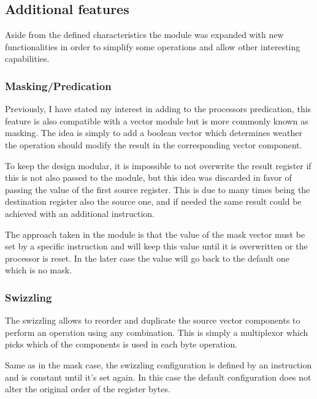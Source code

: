 \subsection{Additional features}
Aside from the defined characteristics the module was expanded with
new functionalities in order to simplify some operations and allow 
other interesting capabilities.

\subsubsection{Masking/Predication}

Previously, I have stated my interest in adding to the processors 
predication, this feature is also compatible with a vector module
but is more commonly known as masking. The idea is simply to add
a boolean vector which determines weather the operation should modify
the result in the corresponding vector component. 

\medbreak
To keep the design modular, it is impossible to not overwrite the 
result register if this is not also passed to the module, but this 
idea was discarded in favor of passing the value of the first source
register. This is due to many times being the destination register also
the source one, and if needed the same result could be achieved with 
an additional instruction. 

\medbreak
The approach taken in the module is that the value of the mask vector 
must be set by a specific instruction and will keep this value until 
it is overwritten or the processor is reset. In the later case the value
will go back to the default one which is no mask.

\subsubsection{Swizzling}

The swizzling allows to reorder and duplicate the source vector components
to perform an operation using any combination. This is simply a multiplexor 
which picks which of the components is used in each byte operation. 

\medbreak
Same as in the mask case, the swizzling configuration is defined by an 
instruction and is constant until it's set again. In this case the default
configuration does not alter the original order of the register bytes.


